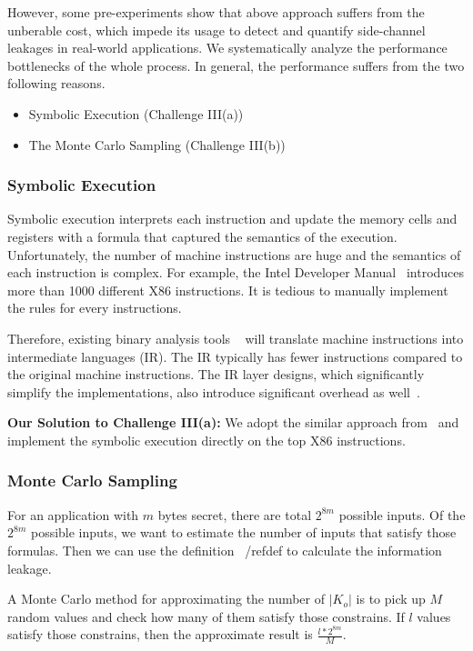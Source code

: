 However, some pre-experiments show that above approach suffers from the unberable cost, which impede its usage
to detect and quantify side-channel leakages in real-world applications. 
We systematically analyze the performance bottlenecks of the whole process. In general, the performance suffers
from the two following reasons. 
\begin{itemize}
    \item Symbolic Execution (Challenge III(a))
    \item The Monte Carlo Sampling  (Challenge III(b))
\end{itemize}

\subsubsection{Symbolic Execution}
Symbolic execution interprets each instruction and update the memory cells and registers with a 
formula that captured the semantics of the execution. Unfortunately, the number of machine instructions 
are huge and the semantics of each instruction is complex. For example, the Intel Developer Manual~\cite{intelsys}
introduces more than 1000 different X86 instructions. It is tedious to manually implement the
rules for every instructions.

Therefore, existing binary analysis tools ~\cite{shoshitaishvili2016state, 10.1007/978-3-642-22110-1_37} 
will translate machine instructions into intermediate languages (IR). The IR typically has fewer 
instructions compared to the original machine instructions. The IR layer designs, which significantly
simplify the implementations, also introduce significant overhead as well~\cite{217563}.

\textbf{Our Solution to Challenge III(a):}
We adopt the similar approach from~\cite{217563} and implement the symbolic execution 
directly on the top X86 instructions.

\subsubsection{Monte Carlo Sampling}
\label{MCreasons}
For an application with $m$ bytes secret, there are total $2^{8m}$ possible inputs. Of the
$2^{8m}$ possible inputs, we want to estimate the number of inputs that satisfy those formulas.
Then we can use the definition ~/ref{def} to calculate the information leakage.

A Monte Carlo method for approximating the number of $|K_o|$ is to pick up 
$M$ random values and check how many of them satisfy those constrains. If $l$ values
satisfy those constrains, then the approximate result is $\frac{l*2^{8m}}{M}$.


